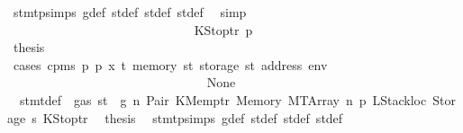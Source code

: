 \begin{isabellebody}
\ stmt{\isachardot}{\kern0pt}psimps{\isacharparenleft}{\kern0pt}{}{\isacharparenright}{\kern0pt}\ g{\isacharunderscore}{\kern0pt}def\ st{\isacharprime}{\kern0pt}{\isacharunderscore}{\kern0pt}def\ st{\isacharprime}{\kern0pt}{\isacharprime}{\kern0pt}{\isacharunderscore}{\kern0pt}def\ st{\isacharprime}{\kern0pt}{\isacharprime}{\kern0pt}{\isacharprime}{\kern0pt}{\isacharunderscore}{\kern0pt}def\ \isamarkupfalse%
\ simp\isanewline
\ \ \ \ \ \ \ \ \ \ \ \ \ \ \ \ \ \ \ \ \ \ \ \ \ \ \isamarkupfalse%
\isanewline
\ \ \ \ \ \ \ \ \ \ \ \ \ \ \ \ \ \ \ \ \ \ \ \ \ \ \ \ \isamarkupfalse%
\ {\isacharparenleft}{\kern0pt}KStoptr\ p{\isacharprime}{\kern0pt}{\isacharparenright}{\kern0pt}\isanewline
\ \ \ \ \ \ \ \ \ \ \ \ \ \ \ \ \ \ \ \ \ \ \ \ \ \ \ \ \isamarkupfalse%
\ \isamarkupfalse%
\ {\isacharquery}{\kern0pt}thesis\isanewline
\ \ \ \ \ \ \ \ \ \ \ \ \ \ \ \ \ \ \ \ \ \ \ \ \ \ \ \ \isamarkupfalse%
\ {\isacharparenleft}{\kern0pt}cases\ {\isachardoublequoteopen}cpm{}s\ p\ p{\isacharprime}{\kern0pt}\ x\ t\ {\isacharparenleft}{\kern0pt}memory\ st{\isacharprime}{\kern0pt}{\isacharprime}{\kern0pt}{\isacharprime}{\kern0pt}{\isacharparenright}{\kern0pt}\ {\isacharparenleft}{\kern0pt}storage\ st{\isacharprime}{\kern0pt}{\isacharprime}{\kern0pt}{\isacharprime}{\kern0pt}\ {\isacharparenleft}{\kern0pt}address\ env{\isacharparenright}{\kern0pt}{\isacharparenright}{\kern0pt}{\isachardoublequoteclose}{\isacharparenright}{\kern0pt}\isanewline
\ \ \ \ \ \ \ \ \ \ \ \ \ \ \ \ \ \ \ \ \ \ \ \ \ \ \ \ \ \ \isamarkupfalse%
\ None\isanewline
\ \ \ \ \ \ \ \ \ \ \ \ \ \ \ \ \ \ \ \ \ \ \ \ \ \ \ \ \ \ \isamarkupfalse%
\ {}{\isacharparenleft}{\kern0pt}{}{\isacharparenright}{\kern0pt}\ stmt{\isacharunderscore}{\kern0pt}def\ {\isacharbackquoteopen}{\isasymnot}\ gas\ st\ {\isasymle}\ g{\isacharbackquoteclose}\ n\ Pair\ KMemptr\ Memory\ MTArray\ n{}\ p{}\ LStackloc\ Storage\ s{}\ KStoptr\ \isamarkupfalse%
\ {\isacharquery}{\kern0pt}thesis\ \isamarkupfalse%
\ stmt{\isachardot}{\kern0pt}psimps{\isacharparenleft}{\kern0pt}{}{\isacharparenright}{\kern0pt}\ g{\isacharunderscore}{\kern0pt}def\ st{\isacharprime}{\kern0pt}{\isacharunderscore}{\kern0pt}def\ st{\isacharprime}{\kern0pt}{\isacharprime}{\kern0pt}{\isacharunderscore}{\kern0pt}def\ st{\isacharprime}{\kern0pt}{\isacharprime}{\kern0pt}{\isacharprime}{\kern0pt}{\isacharunderscore}{\kern0pt}def\ \isamarkupfalse%

\end{isabellebody}

